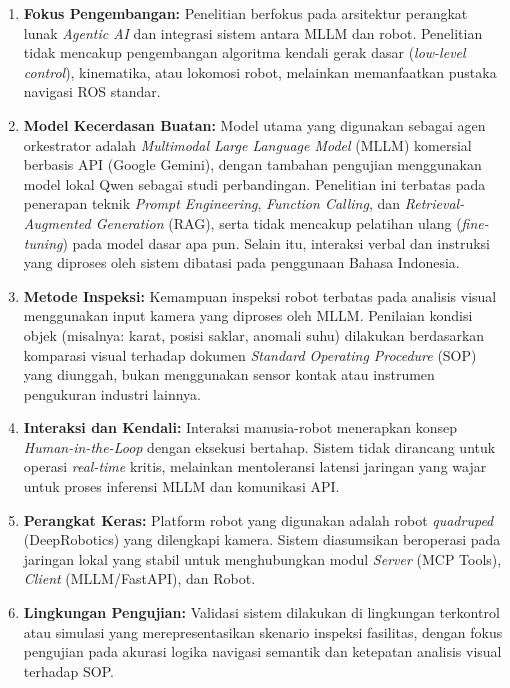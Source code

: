 \begin{enumerate}
    \item \textbf{Fokus Pengembangan:} Penelitian berfokus pada arsitektur perangkat lunak \textit{Agentic AI} dan integrasi sistem antara MLLM dan robot. Penelitian tidak mencakup pengembangan algoritma kendali gerak dasar (\textit{low-level control}), kinematika, atau lokomosi robot, melainkan memanfaatkan pustaka navigasi ROS standar.
    
    \item \textbf{Model Kecerdasan Buatan:} Model utama yang digunakan sebagai agen orkestrator adalah \textit{Multimodal Large Language Model} (MLLM) komersial berbasis API (Google Gemini), dengan tambahan pengujian menggunakan model lokal Qwen sebagai studi perbandingan. Penelitian ini terbatas pada penerapan teknik \textit{Prompt Engineering}, \textit{Function Calling}, dan \textit{Retrieval-Augmented Generation} (RAG), serta tidak mencakup pelatihan ulang (\textit{fine-tuning}) pada model dasar apa pun. Selain itu, interaksi verbal dan instruksi yang diproses oleh sistem dibatasi pada penggunaan Bahasa Indonesia.
    
    \item \textbf{Metode Inspeksi:} Kemampuan inspeksi robot terbatas pada analisis visual menggunakan input kamera yang diproses oleh MLLM. Penilaian kondisi objek (misalnya: karat, posisi saklar, anomali suhu) dilakukan berdasarkan komparasi visual terhadap dokumen \textit{Standard Operating Procedure} (SOP) yang diunggah, bukan menggunakan sensor kontak atau instrumen pengukuran industri lainnya.
    
    \item \textbf{Interaksi dan Kendali:} Interaksi manusia-robot menerapkan konsep \textit{Human-in-the-Loop} dengan eksekusi bertahap. Sistem tidak dirancang untuk operasi \textit{real-time} kritis, melainkan mentoleransi latensi jaringan yang wajar untuk proses inferensi MLLM dan komunikasi API.
    
    \item \textbf{Perangkat Keras:} Platform robot yang digunakan adalah robot \textit{quadruped} (DeepRobotics) yang dilengkapi kamera. Sistem diasumsikan beroperasi pada jaringan lokal yang stabil untuk menghubungkan modul \textit{Server} (MCP Tools), \textit{Client} (MLLM/FastAPI), dan Robot.
    
    \item \textbf{Lingkungan Pengujian:} Validasi sistem dilakukan di lingkungan terkontrol atau simulasi yang merepresentasikan skenario inspeksi fasilitas, dengan fokus pengujian pada akurasi logika navigasi semantik dan ketepatan analisis visual terhadap SOP.
\end{enumerate}


